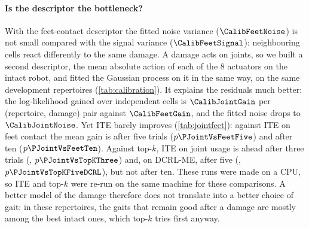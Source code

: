\documentclass[11pt,a4paper]{article}
\newcommand{\DCRL}{DCRL-ME}
\begin{document}
\paragraph{Is the descriptor the bottleneck?} With the feet-contact descriptor the fitted noise variance
($\CalibFeetNoise$) is not small compared with the signal variance ($\CalibFeetSignal$): neighbouring cells react
differently to the same damage. A damage acts on joints, so we built a second descriptor, the mean absolute action of
each of the 8 actuators on the intact robot, and fitted the Gaussian process on it in the same way, on the same
development repertoires (\cref{tab:calibration}). It explains the residuals much better: the log-likelihood gained
over independent cells is $\CalibJointGain$ per (repertoire, damage) pair against $\CalibFeetGain$, and the fitted
noise drops to $\CalibJointNoise$. Yet ITE barely improves (\cref{tab:jointfeet}): against ITE on feet contact the
mean gain is \JointVsFeetFive{} after five trials ($p\PJointVsFeetFive$) and \JointVsFeetTen{} after ten
($p\PJointVsFeetTen$). Against top-$k$, ITE on joint usage is ahead after three trials (\JointVsTopKThree, $p\PJointVsTopKThree$)
and, on \DCRL, after five (\JointVsTopKFiveDCRL, $p\PJointVsTopKFiveDCRL$), but not after ten. These runs were made on
a CPU, so ITE and top-$k$ were re-run on the same machine for these comparisons. A better model of the damage
therefore does not translate into a better choice of gait: in these repertoires, the gaits that remain good after a
damage are mostly among the best intact ones, which top-$k$ tries first anyway.

\begin{table}[htbp]
\centering\small
\caption{Gaussian-process hyper-parameters fitted by maximum marginal likelihood on the development repertoires for
each descriptor, and log-likelihood gained over independent cells, per (repertoire, damage) pair.}
\label{tab:calibration}

\vspace{1em}
\caption{ITE on joint usage minus ITE on feet contact: mean difference in $v$ and paired Wilcoxon test, over the
(repertoire, damage) units.}
\label{tab:jointfeet}

\end{table}
\end{document}
